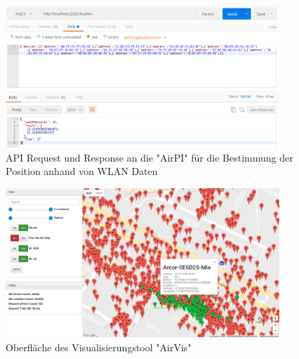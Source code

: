 \documentclass[11pt,a4paper]{article}
\begin{document}
\newpage
\begin{figure}[htbp]
    \centering
    \includegraphics[width=0.92\textwidth]{pics/screenshots/AirPI_Request.png}
    \caption{API Request und Response an die "AirPI" für die Bestimmung der Position anhand von WLAN Daten}
    \label{fig:ScreenShot_AirPI}
\end{figure}

\begin{figure}[htbp]
    \centering
    \includegraphics[width=0.92\textwidth]{pics/screenshots/AirVis.png}
    \caption{Oberfläche des Visualisierungstool "AirVis"}
    \label{fig:ScreenShot_AirVis}
\end{figure}

\newpage
\end{document}
